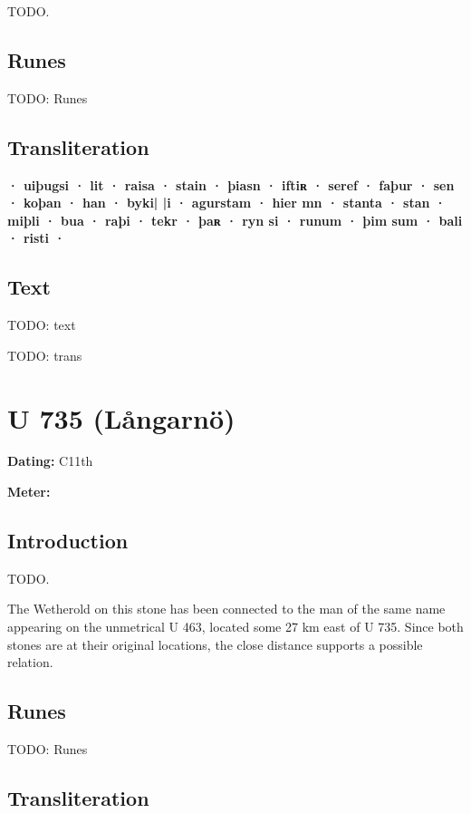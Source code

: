 TODO.

\subsection{Runes}

TODO: Runes%

\subsection{Transliteration}

\textbf{· uiþugsi · lit · raisa · stain · þiasn · iftiʀ · seref · faþur · sen · koþan · han · byki| |i · agurstam · hier mn · stanta · stan · miþli · bua · raþi · tekr · þaʀ · ryn si · runum · þim sum · bali · risti ·}

\subsection{Text}

\bpg\bpa[0]%
TODO: text\epa

\bpb TODO: trans\epb\epg

\sectionline\clearpage


\section{U 735 (Långarnö)}

\begin{flushright}%
\textbf{Dating:} C11th

\textbf{Meter:} \Fornyrdislag
\end{flushright}%

\subsection{Introduction}

TODO.

The Wetherold on this stone has been connected to the man of the same name appearing on the unmetrical U 463, located some 27 km east of U 735.  Since both stones are at their original locations, the close distance supports a possible relation.

\subsection{Runes}

TODO: Runes%

\subsection{Transliteration}


